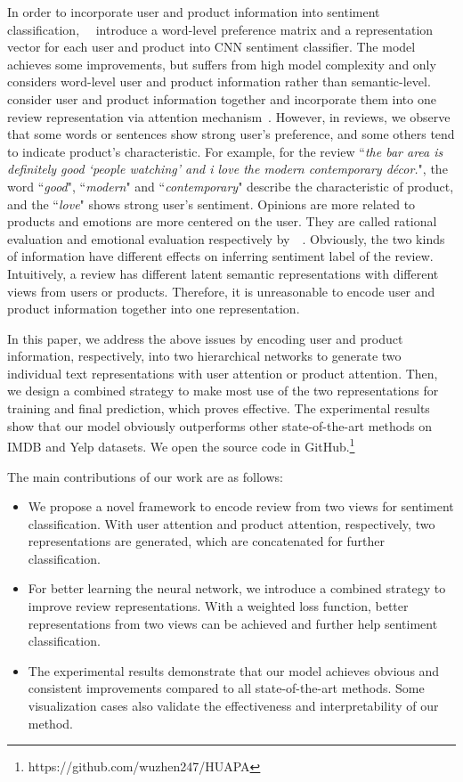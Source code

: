 \documentclass[letterpaper]{article} \usepackage{aaai18}  \usepackage{times}  \usepackage{helvet}  \usepackage{courier}  \usepackage{url}  \usepackage{graphicx}  \frenchspacing  \usepackage{amsmath}
\begin{document}
In order to incorporate user and product information into sentiment classification,~\citeauthor{tang2015learning}~ introduce a word-level preference matrix and a representation vector for each user and product into CNN sentiment classifier. The model achieves some improvements, but suffers from high model complexity and only considers word-level user and product information rather than semantic-level.~\citeauthor{chen2016neural}~ consider user and product information together and incorporate them into one review representation via attention mechanism~\cite{bahdanau2014neural}. However, in reviews, we observe that some words or sentences show strong user's preference, and some others tend to indicate product's characteristic. For example, for the review ``\textit{the bar area is definitely good `people watching' and i love the modern contemporary d{\'e}cor.}", the word ``\textit{good}", ``\textit{modern}" and ``\textit{contemporary}" describe the characteristic of product, and the ``\textit{love}" shows strong user's sentiment. Opinions are more related to products and emotions are more centered on the user. They are called rational evaluation and emotional evaluation respectively by~\citeauthor{liu2012sentiment}~. Obviously, the two kinds of information have different effects on inferring sentiment label of the review. Intuitively, a review has different latent semantic representations with different views from users or products. Therefore, it is unreasonable to encode user and product information together into one representation.

In this paper, we address the above issues by encoding user and product information, respectively, into two hierarchical networks to generate two individual text representations with user attention or product attention. Then, we design a combined strategy to make most use of the two representations for training and final prediction, which proves effective. The experimental results show that our model obviously outperforms other state-of-the-art methods on IMDB and Yelp datasets. We open the source code in GitHub.\footnote{https://github.com/wuzhen247/HUAPA}

The main contributions of our work are as follows:
\begin{itemize}
\item We propose a novel framework to encode review from two views for sentiment classification. With user attention and product attention, respectively, two representations are generated, which are concatenated for further classification.
\item For better learning the neural network, we introduce a combined strategy to improve review representations. With a weighted loss function, better representations from two views can be achieved and further help sentiment classification.
\item The experimental results demonstrate that our model achieves obvious and consistent improvements compared to all state-of-the-art methods. Some visualization cases also validate the effectiveness and interpretability of our method.
\end{itemize}
\end{document}
